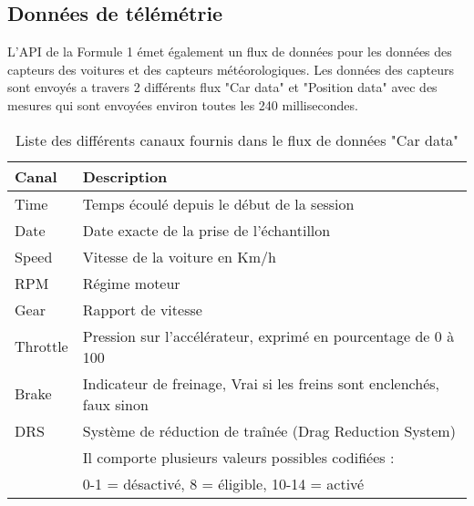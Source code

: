 \subsection{Données de télémétrie}
L'API de la Formule 1 émet également un flux de données pour les données des capteurs des voitures et des capteurs météorologiques.
Les données des capteurs sont envoyés a travers 2 différents flux "Car data" et "Position data" avec des mesures qui sont envoyées environ toutes les 240 millisecondes.
\begin{table}[H]
    \begin{center}
        \caption{Liste des différents canaux fournis dans le flux de données "Car data"}
        \begin{tabular}{l|l}
            Canal    & Description                                                            \\ \hline
            Time     & Temps écoulé depuis le début de la session                             \\
            Date     & Date exacte de la prise de l'échantillon                               \\
            Speed    & Vitesse de la voiture en Km/h                                          \\
            RPM      & Régime moteur                                                          \\
            Gear     & Rapport de vitesse                                                     \\
            Throttle & Pression sur l'accélérateur, exprimé en pourcentage de 0 à 100         \\
            Brake    & Indicateur de freinage, Vrai si les freins sont enclenchés, faux sinon \\
            DRS      & Système de réduction de traînée (Drag Reduction System)                \\
                     & Il comporte plusieurs valeurs possibles codifiées :                    \\
                     & 0-1 = désactivé, 8 = éligible, 10-14 = activé
        \end{tabular}
    \end{center}
\end{table}

